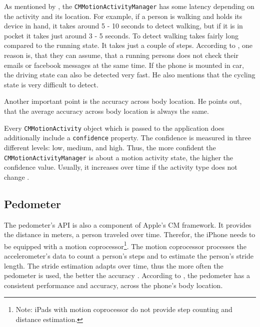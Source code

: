 As mentioned by \citet{apple:wwdc_2014_pham}, the \texttt{CMMotionActivityManager} has some latency depending on the activity and its location. For example, if a person is walking and holds its device in hand, it takes around 5 - 10 seconds to detect walking, but if it is in pocket it takes just around 3 - 5 seconds. To detect walking takes fairly long compared to the running state. It takes just a couple of steps. According to \citet{apple:wwdc_2014_pham}, one reason is, that they can assume, that a running persons does not check their emails or facebook messages at the same time. If the phone is mounted in car, the driving state can also be detected very fast. He also mentions that the cycling state is very difficult to detect.

Another important point is the accuracy across body location. He points out, that the average accuracy across body location is always the same.

Every \texttt{CMMotionActivity} object which is passed to the application does additionally include a \texttt{confidence} property. The confidence is measured in three different levels: low, medium, and high. Thus, the more confident the \texttt{CMMotionActivityManager} is about a motion activity state, the higher the confidence value. Usually, it increases over time if the activity type does not change \citep{apple:wwdc_2014_pham,apple:ios_doc_cm}.


\subsection{Pedometer}
The pedometer's \acs{API} is also a component of Apple's \acs{CM} framework. It provides the distance in meters, a person traveled over time. Therefor, the iPhone needs to be equipped with a motion coprocessor\footnote{Note: iPads with motion coprocessor do not provide step counting and distance estimation.}. The motion coprocessor processes the accelerometer's data to count a person's steps and to estimate the person's stride length. The stride estimation adapts over time, thus the more often the pedometer is used, the better the accuracy \citep{apple:wwdc_2014_pham}. According to \citet{apple:wwdc_2014_pham}, the pedometer has a consistent performance and accuracy, across the phone's body location.

